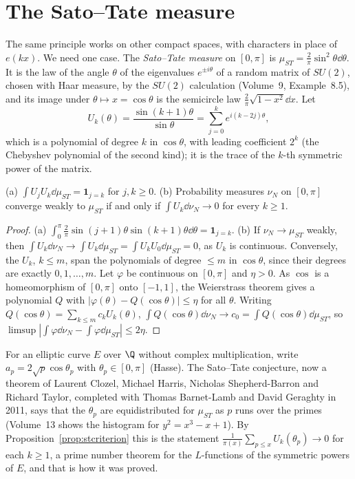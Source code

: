 \section{The Sato--Tate measure}

The same principle works on other compact spaces, with characters in place of $e(kx)$. We need one case. The \emph{Sato--Tate measure} on $[0,\pi]$ is $\mu_{ST}=\frac2\pi\sin^2\theta\dd\theta$. It is the law of the angle $\theta$ of the eigenvalues $e^{\pm i\theta}$ of a random matrix of $SU(2)$, chosen with Haar measure, by the $SU(2)$ calculation (Volume~9, Example~8.5), and its image under $\theta\mapsto x=\cos\theta$ is the semicircle law $\frac2\pi\sqrt{1-x^2}\dd x$. Let
\[
U_k(\theta)=\frac{\sin(k+1)\theta}{\sin\theta}=\sum_{j=0}^ke^{i(k-2j)\theta},
\]
which is a polynomial of degree $k$ in $\cos\theta$, with leading coefficient $2^k$ (the Chebyshev polynomial of the second kind); it is the trace of the $k$-th symmetric power of the matrix.

\begin{proposition}\label{prop:stcriterion}
(a) $\int U_jU_k\dd\mu_{ST}=\mathbf 1_{j=k}$ for $j,k\ge0$. (b) Probability measures $\nu_N$ on $[0,\pi]$ converge weakly to $\mu_{ST}$ if and only if $\int U_k\dd\nu_N\to0$ for every $k\ge1$.
\end{proposition}
\begin{proof}
(a) $\int_0^\pi\frac2\pi\sin(j+1)\theta\sin(k+1)\theta\dd\theta=\mathbf 1_{j=k}$. (b) If $\nu_N\to\mu_{ST}$ weakly, then $\int U_k\dd\nu_N\to\int U_k\dd\mu_{ST}=\int U_kU_0\dd\mu_{ST}=0$, as $U_k$ is continuous. Conversely, the $U_k$, $k\le m$, span the polynomials of degree $\le m$ in $\cos\theta$, since their degrees are exactly $0,1,\dots,m$. Let $\varphi$ be continuous on $[0,\pi]$ and $\eta>0$. As $\cos$ is a homeomorphism of $[0,\pi]$ onto $[-1,1]$, the Weierstrass theorem gives a polynomial $Q$ with $|\varphi(\theta)-Q(\cos\theta)|\le\eta$ for all $\theta$. Writing $Q(\cos\theta)=\sum_{k\le m}c_kU_k(\theta)$, $\int Q(\cos\theta)\dd\nu_N\to c_0=\int Q(\cos\theta)\dd\mu_{ST}$, so $\limsup|\int\varphi\dd\nu_N-\int\varphi\dd\mu_{ST}|\le2\eta$.
\end{proof}

For an elliptic curve $E$ over $\Q$ without complex multiplication, write $a_p=2\sqrt p\cos\theta_p$ with $\theta_p\in[0,\pi]$ (Hasse). The Sato--Tate conjecture, now a theorem of Laurent Clozel, Michael Harris, Nicholas Shepherd-Barron and Richard Taylor, completed with Thomas Barnet-Lamb and David Geraghty in 2011, says that the $\theta_p$ are equidistributed for $\mu_{ST}$ as $p$ runs over the primes (Volume~13 shows the histogram for $y^2=x^3-x+1$). By Proposition~\ref{prop:stcriterion} this is the statement $\frac1{\pi(x)}\sum_{p\le x}U_k(\theta_p)\to0$ for each $k\ge1$, a prime number theorem for the $L$-functions of the symmetric powers of $E$, and that is how it was proved.

